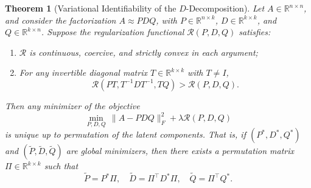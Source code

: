 \documentclass[10pt,a4paper]{article}
\newtheorem{theorem}{\bf Theorem}[section]
\begin{document}
\begin{theorem}[Variational Identifiability of the $D$-Decomposition]
\label{thm:variational-identifiability}
Let \( A \in \mathbb{R}^{n \times n} \), and consider the factorization \( A \approx P D Q \), with \( P \in \mathbb{R}^{n \times k} \), \( D \in \mathbb{R}^{k \times k} \), and \( Q \in \mathbb{R}^{k \times n} \). Suppose the regularization functional \( \mathcal{R}(P, D, Q) \) satisfies:
\begin{enumerate}
    \item[\textbf{(i)}] \( \mathcal{R} \) is continuous, coercive, and strictly convex in each argument;
    \item[\textbf{(ii)}] For any invertible diagonal matrix \( T \in \mathbb{R}^{k \times k} \) with \( T \ne I \),
    \[
    \mathcal{R}(PT, T^{-1} D T^{-1}, TQ) > \mathcal{R}(P, D, Q).
    \]
\end{enumerate}
Then any minimizer of the objective
\[
\min_{P, D, Q} \, \|A - P D Q\|_F^2 + \lambda \mathcal{R}(P, D, Q)
\]
is unique up to permutation of the latent components. That is, if \( (P^*, D^*, Q^*) \) and \( (\tilde{P}, \tilde{D}, \tilde{Q}) \) are global minimizers, then there exists a permutation matrix \( \Pi \in \mathbb{R}^{k \times k} \) such that
\[
\tilde{P} = P^* \Pi, \quad \tilde{D} = \Pi^\top D^* \Pi, \quad \tilde{Q} = \Pi^\top Q^*.
\]
\end{theorem}
\end{document}
